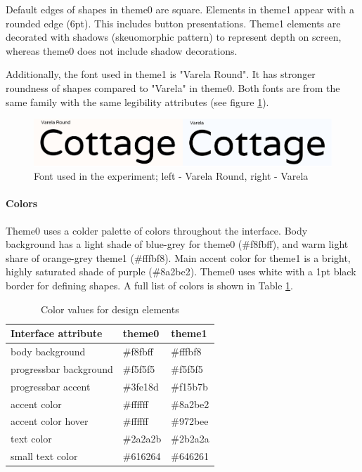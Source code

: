 	Default edges of shapes in theme0 are square. Elements in theme1 appear with a rounded edge (6pt). This includes button presentations. Theme1 elements are decorated with shadows (skeuomorphic pattern) to represent depth on screen, whereas theme0 does not include shadow decorations.
	
	Additionally, the font used in theme1 is "Varela Round". It has stronger roundness of shapes compared to "Varela" in theme0. Both fonts are from the same family with the same legibility attributes (see figure \ref{fig:fontdifferencewide}).
	
\begin{figure}[h!]
	\centering
	\includegraphics[width=0.8\linewidth]{graphics/designfeatures/Font_difference_wide}
	\caption{Font used in the experiment; left - Varela Round, right - Varela}
	\label{fig:fontdifferencewide}
\end{figure}


	\paragraph{Colors}
	
	Theme0 uses a colder palette of colors throughout the interface. Body background has a light shade of blue-grey for theme0 (\#f8fbff), and warm light share of orange-grey theme1 (\#fffbf8). Main accent color for theme1 is a bright, highly saturated shade of purple (\#8a2be2). Theme0 uses white with a 1pt black border for defining shapes. A full list of colors is shown in Table \ref{table:design-attributes}.
	
	\begin{table}[h!]
		\centering
		\begin{tabular}{|l|l|l|}
			\hline
			Interface attribute    & theme0   & theme1   \\ 
			\hline
			body background        & \#f8fbff & \#fffbf8 \\
			progressbar background & \#f5f5f5 & \#f5f5f5 \\
			progressbar accent     & \#3fe18d & \#f15b7b \\
			accent color           & \#ffffff & \#8a2be2 \\
			accent color hover     & \#ffffff & \#972bee \\ 
			text color 			   & \#2a2a2b & \#2b2a2a \\
			small text color 	   & \#616264 & \#646261 \\ \hline
		\end{tabular}
		\caption{Color values for design elements}
		\label{table:design-attributes}
	\end{table}
	
